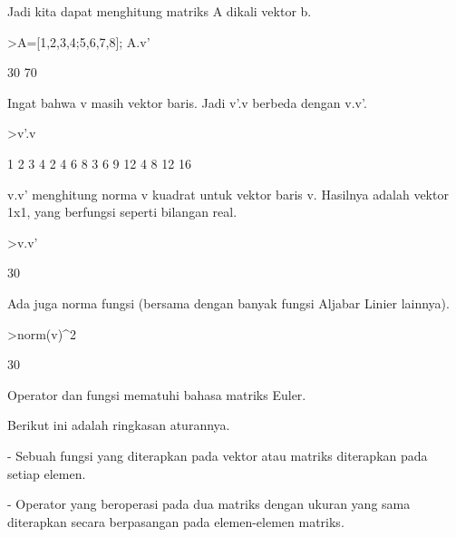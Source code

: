 \documentclass{article}
\begin{document}
\begin{eulernotebook}
\begin{eulercomment}
Jadi kita dapat menghitung matriks A dikali vektor b.
\end{eulercomment}
\begin{eulerprompt}
>A=[1,2,3,4;5,6,7,8]; A.v'
\end{eulerprompt}
\begin{euleroutput}
             30 
             70 
\end{euleroutput}
\begin{eulercomment}
Ingat bahwa v masih vektor baris. Jadi v'.v berbeda dengan v.v'.
\end{eulercomment}
\begin{eulerprompt}
>v'.v
\end{eulerprompt}
\begin{euleroutput}
              1             2             3             4 
              2             4             6             8 
              3             6             9            12 
              4             8            12            16 
\end{euleroutput}
\begin{eulercomment}
v.v' menghitung norma v kuadrat untuk vektor baris v. Hasilnya adalah
vektor 1x1, yang berfungsi seperti bilangan real.
\end{eulercomment}
\begin{eulerprompt}
>v.v'
\end{eulerprompt}
\begin{euleroutput}
  30
\end{euleroutput}
\begin{eulercomment}
Ada juga norma fungsi (bersama dengan banyak fungsi Aljabar Linier
lainnya).
\end{eulercomment}
\begin{eulerprompt}
>norm(v)^2
\end{eulerprompt}
\begin{euleroutput}
  30
\end{euleroutput}
\begin{eulercomment}
Operator dan fungsi mematuhi bahasa matriks Euler.


Berikut ini adalah ringkasan aturannya.


- Sebuah fungsi yang diterapkan pada vektor atau matriks diterapkan
pada setiap elemen.


- Operator yang beroperasi pada dua matriks dengan ukuran yang sama
diterapkan secara berpasangan pada elemen-elemen matriks.



\end{eulercomment}
\end{eulernotebook}
\end{document}
